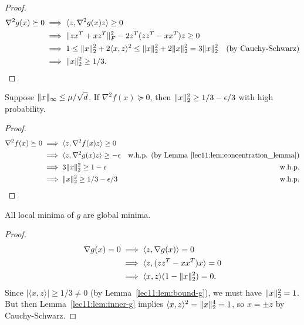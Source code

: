 \begin{proof}
\begin{align}
    \nabla^2 g(x) \succeq 0
    &\implies \langle z, \nabla^2 g(x)z\rangle \geq 0 \\
    &\implies \|zx^T + xz^T\|_F^2 - 2z^T(zz^T-xx^T)z \geq 0 \\
    &\implies 1 \leq \|x\|_2^2 + 2\langle x,z \rangle^2 \leq \|x\|_2^2 + 2\|x\|_2^2 = 3\|x\|_2^2 &\text{(by Cauchy-Schwarz)} \\
    &\implies \|x\|_2^2 \geq 1/3.
\end{align}
\end{proof}

\begin{lemma}\label{lec11:lem:bound-f}
    Suppose $\|x\|_\infty \leq \mu / \sqrt{d}$. If $\nabla^2 f(x) \succeq 0$, then $\|x\|_2^2 \geq 1/3 - \epsilon/3$ with high probability.
\end{lemma}
\begin{proof}
\begin{align}
    \nabla^2 f(x) \succeq 0
    &\implies \langle z, \nabla^2 f(x)z \rangle \geq 0 \\
    &\implies \langle z, \nabla^2g(x)z \rangle \geq -\epsilon & \text{w.h.p. (by Lemma \ref{lec11:lem:concentration_lemma})} \\
    &\implies 3\|x\|_2^2 \geq 1-\epsilon & \text{w.h.p.} \\
    &\implies \|x\|_2^2 \geq 1/3 - \epsilon/3 & \text{w.h.p.}
\end{align}
\end{proof}

\begin{lemma}
    All local minima of $g$ are global minima.
\end{lemma}

\begin{proof}
\begin{align}
    \nabla g(x) = 0
    & \implies \langle z, \nabla g(x) \rangle = 0 \\
    & \implies \langle z, (zz^T-xx^T)x \rangle = 0 \\
    & \implies \langle x,z\rangle (1-\|x\|_2^2) = 0.
\end{align}
Since $|\langle x,z \rangle| \geq 1/3 \neq 0$ (by Lemma~\ref{lec11:lem:bound-g}), we must have $\|x\|_2^2 = 1$. But then Lemma~\ref{lec11:lem:inner-g} implies $\langle x, z\rangle^2 = \|x\|_2^4 = 1$, so $x = \pm z$ by Cauchy-Schwarz.
\end{proof}

